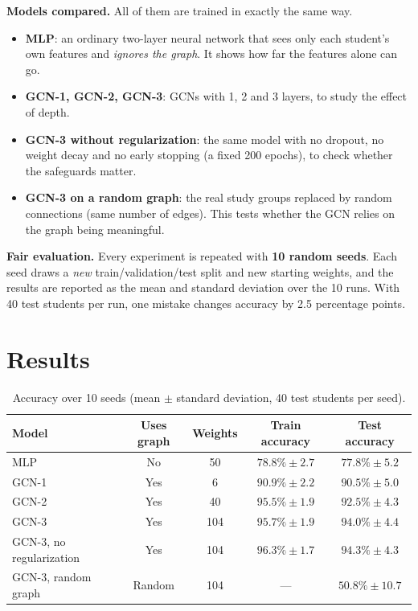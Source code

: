 \documentclass[11pt,a4paper]{article}
\begin{document}
\textbf{Models compared.} All of them are trained in exactly the same way.
\begin{itemize}
  \item \textbf{MLP}: an ordinary two-layer neural network that sees only each student's own features and \emph{ignores the graph}. It shows how far the features alone can go.
  \item \textbf{GCN-1, GCN-2, GCN-3}: GCNs with 1, 2 and 3 layers, to study the effect of depth.
  \item \textbf{GCN-3 without regularization}: the same model with no dropout, no weight decay and no early stopping (a fixed 200 epochs), to check whether the safeguards matter.
  \item \textbf{GCN-3 on a random graph}: the real study groups replaced by random connections (same number of edges). This tests whether the GCN relies on the graph being meaningful.
\end{itemize}

\textbf{Fair evaluation.} Every experiment is repeated with \textbf{10 random seeds}. Each seed draws a \emph{new} train/validation/test split and new starting weights, and the results are reported as the mean and standard deviation over the 10 runs. With 40 test students per run, one mistake changes accuracy by 2.5 percentage points.

\section{Results}

\begin{table}[H]
\centering
\caption{Accuracy over 10 seeds (mean $\pm$ standard deviation, 40 test students per seed).}
\label{tab:results}
\begin{tabular}{@{}lcccc@{}}
\toprule
Model & Uses graph & Weights & Train accuracy & Test accuracy \\
\midrule
MLP                        & No  & 50  & $78.8\% \pm 2.7$ & $77.8\% \pm 5.2$ \\
GCN-1                      & Yes & 6   & $90.9\% \pm 2.2$ & $90.5\% \pm 5.0$ \\
GCN-2                      & Yes & 40  & $95.5\% \pm 1.9$ & $92.5\% \pm 4.3$ \\
GCN-3                      & Yes & 104 & $95.7\% \pm 1.9$ & $\mathbf{94.0\% \pm 4.4}$ \\
GCN-3, no regularization   & Yes & 104 & $96.3\% \pm 1.7$ & $94.3\% \pm 4.3$ \\
GCN-3, random graph        & Random & 104 & --- & $50.8\% \pm 10.7$ \\
\bottomrule
\end{tabular}
\end{table}
\end{document}
